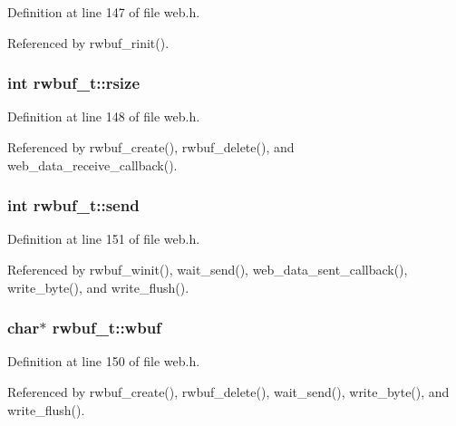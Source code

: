 Definition at line 147 of file web.\+h.



Referenced by rwbuf\+\_\+rinit().

\subsubsection[{\texorpdfstring{rsize}{rsize}}]{\setlength{\rightskip}{0pt plus 5cm}int rwbuf\+\_\+t\+::rsize}\hypertarget{structrwbuf__t_aa4094c7e329ae85cc50dbd06d3b50d44}{}\label{structrwbuf__t_aa4094c7e329ae85cc50dbd06d3b50d44}


Definition at line 148 of file web.\+h.



Referenced by rwbuf\+\_\+create(), rwbuf\+\_\+delete(), and web\+\_\+data\+\_\+receive\+\_\+callback().

\subsubsection[{\texorpdfstring{send}{send}}]{\setlength{\rightskip}{0pt plus 5cm}int rwbuf\+\_\+t\+::send}\hypertarget{structrwbuf__t_a279490994b6576ad00900254a8c07a89}{}\label{structrwbuf__t_a279490994b6576ad00900254a8c07a89}


Definition at line 151 of file web.\+h.



Referenced by rwbuf\+\_\+winit(), wait\+\_\+send(), web\+\_\+data\+\_\+sent\+\_\+callback(), write\+\_\+byte(), and write\+\_\+flush().

\subsubsection[{\texorpdfstring{wbuf}{wbuf}}]{\setlength{\rightskip}{0pt plus 5cm}char$\ast$ rwbuf\+\_\+t\+::wbuf}\hypertarget{structrwbuf__t_a68386231f3d907ec4508c090925782a2}{}\label{structrwbuf__t_a68386231f3d907ec4508c090925782a2}


Definition at line 150 of file web.\+h.



Referenced by rwbuf\+\_\+create(), rwbuf\+\_\+delete(), wait\+\_\+send(), write\+\_\+byte(), and write\+\_\+flush().

